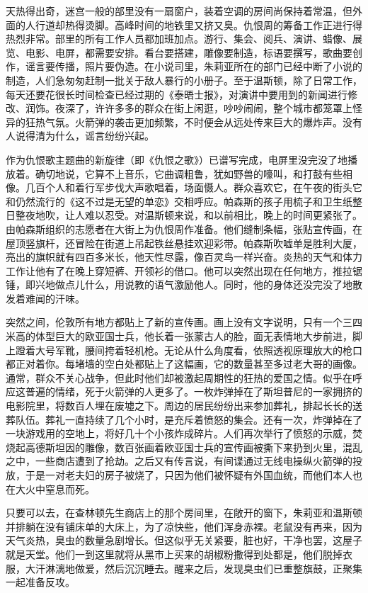 天热得出奇，迷宫一般的部里没有一扇窗户，装着空调的房间尚保持着常温，但外面的人行道却热得烫脚。高峰时间的地铁里又挤又臭。仇恨周的筹备工作正进行得热烈非常。部里的所有工作人员都加班加点。游行、集会、阅兵、演讲、蜡像、展览、电影、电屏，都需要安排。看台要搭建，雕像要制造，标语要撰写，歌曲要创作，谣言要传播，照片要伪造。在小说司里，朱莉亚所在的部门已经中断了小说的制造，人们急匆匆赶制一批关于敌人暴行的小册子。至于温斯顿，除了日常工作，每天还要花很长时间检查已经过期的《泰晤士报》，对演讲中要用到的新闻进行修改、润饰。夜深了，许许多多的群众在街上闲逛，吵吵闹闹，整个城市都笼罩上怪异的狂热气氛。火箭弹的袭击更加频繁，不时便会从远处传来巨大的爆炸声。没有人说得清为什么，谣言纷纷兴起。

作为仇恨歌主题曲的新旋律（即《仇恨之歌》）已谱写完成，电屏里没完没了地播放着。确切地说，它算不上音乐，它曲调粗鲁，犹如野兽的嚎叫，和打鼓有些相像。几百个人和着行军步伐大声歌唱着，场面慑人。群众喜欢它，在午夜的街头它和仍然流行的《这不过是无望的单恋》交相呼应。帕森斯的孩子用梳子和卫生纸整日整夜地吹，让人难以忍受。对温斯顿来说，和以前相比，晚上的时间更紧张了。由帕森斯组织的志愿者在大街上为仇恨周作准备。他们缝制条幅，张贴宣传画，在屋顶竖旗杆，还冒险在街道上吊起铁丝悬挂欢迎彩带。帕森斯吹嘘单是胜利大厦，亮出的旗帜就有四百多米长，他天性尽露，像百灵鸟一样兴奋。炎热的天气和体力工作让他有了在晚上穿短裤、开领衫的借口。他可以突然出现在任何地方，推拉锯锤，即兴地做点儿什么，用说教的语气激励他人。同时，他的身体还没完没了地散发着难闻的汗味。

突然之间，伦敦所有地方都贴上了新的宣传画。画上没有文字说明，只有一个三四米高的体型巨大的欧亚国士兵，他长着一张蒙古人的脸，面无表情地大步前进，脚上蹬着大号军靴，腰间挎着轻机枪。无论从什么角度看，依照透视原理放大的枪口都正对着你。每堵墙的空白处都贴上了这幅画，它的数量甚至多过老大哥的画像。通常，群众不关心战争，但此时他们却被激起周期性的狂热的爱国之情。似乎在呼应这普遍的情绪，死于火箭弹的人更多了。一枚炸弹掉在了斯坦普尼的一家拥挤的电影院里，将数百人埋在废墟之下。周边的居民纷纷出来参加葬礼，排起长长的送葬队伍。葬礼一直持续了几个小时，是充斥着愤怒的集会。还有一次，炸弹掉在了一块游戏用的空地上，将好几十个小孩炸成碎片。人们再次举行了愤怒的示威，焚烧起高德斯坦因的雕像，数百张画着欧亚国士兵的宣传画被撕下来扔到火里，混乱之中，一些商店遭到了抢劫。之后又有传言说，有间谍通过无线电操纵火箭弹的投放，于是一对老夫妇的房子被烧了，只因为他们被怀疑有外国血统，而他们本人也在大火中窒息而死。

只要可以去，在查林顿先生商店上的那个房间里，在敞开的窗下，朱莉亚和温斯顿并排躺在没有铺床单的大床上，为了凉快些，他们浑身赤裸。老鼠没有再来，因为天气炎热，臭虫的数量急剧增长。但这似乎无关紧要，脏也好，干净也罢，这屋子就是天堂。他们一到这里就将从黑市上买来的胡椒粉撒得到处都是，他们脱掉衣服，大汗淋漓地做爱，然后沉沉睡去。醒来之后，发现臭虫们已重整旗鼓，正聚集一起准备反攻。

